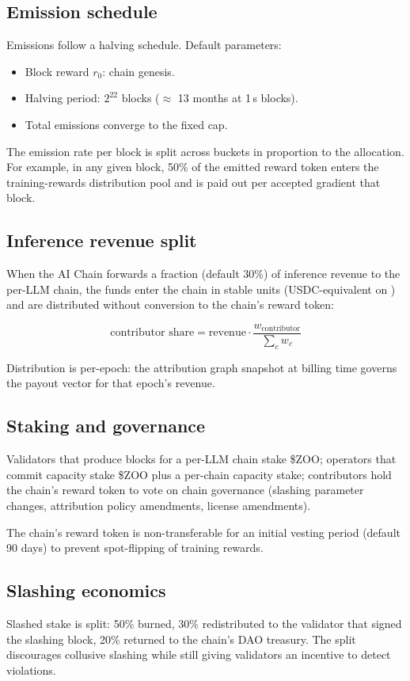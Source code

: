 \subsection{Emission schedule}

Emissions follow a halving schedule. Default parameters:
\begin{itemize}[nosep]
\item Block reward $r_0$: chain genesis.
\item Halving period: $2^{22}$ blocks ($\approx$ 13 months at 1\,s blocks).
\item Total emissions converge to the fixed cap.
\end{itemize}

The emission rate per block is split across buckets in proportion to the allocation. For example, in any given block, 50\% of the emitted reward token enters the training-rewards distribution pool and is paid out per accepted gradient that block.

\subsection{Inference revenue split}

When the \Hanzo{} AI Chain forwards a fraction (default 30\%) of inference revenue to the per-LLM chain, the funds enter the chain in stable units (USDC-equivalent on \Lux{}) and are distributed without conversion to the chain's reward token:

\begin{equation}
\text{contributor share} = \text{revenue} \cdot \frac{w_{\text{contributor}}}{\sum_c w_c}
\end{equation}

Distribution is per-epoch: the attribution graph snapshot at billing time governs the payout vector for that epoch's revenue.

\subsection{Staking and governance}

Validators that produce blocks for a per-LLM chain stake \$ZOO; operators that commit \GPU{} capacity stake \$ZOO plus a per-chain capacity stake; contributors hold the chain's reward token to vote on chain governance (slashing parameter changes, attribution policy amendments, license amendments).

The chain's reward token is non-transferable for an initial vesting period (default 90 days) to prevent spot-flipping of training rewards.

\subsection{Slashing economics}

Slashed stake is split: 50\% burned, 30\% redistributed to the validator that signed the slashing block, 20\% returned to the chain's DAO treasury. The split discourages collusive slashing while still giving validators an incentive to detect violations.
